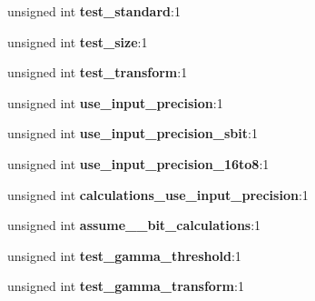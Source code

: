 \begin{DoxyCompactItemize}
\item 
\hypertarget{structpng__modifier_a17ee5be3901e31e15889a9d1219aaf1a}{unsigned int {\bfseries test\+\_\+standard}\+:1}\label{structpng__modifier_a17ee5be3901e31e15889a9d1219aaf1a}

\item 
\hypertarget{structpng__modifier_af2bba8abaec2e8b6a43a9470879157bd}{unsigned int {\bfseries test\+\_\+size}\+:1}\label{structpng__modifier_af2bba8abaec2e8b6a43a9470879157bd}

\item 
\hypertarget{structpng__modifier_a07e46663a0a1716c9cadeabee28fb276}{unsigned int {\bfseries test\+\_\+transform}\+:1}\label{structpng__modifier_a07e46663a0a1716c9cadeabee28fb276}

\item 
\hypertarget{structpng__modifier_a45224d5d5b3b1eaa224e5f294590e587}{unsigned int {\bfseries use\+\_\+input\+\_\+precision}\+:1}\label{structpng__modifier_a45224d5d5b3b1eaa224e5f294590e587}

\item 
\hypertarget{structpng__modifier_aa70c641991b61009ef9ec5586fe2af20}{unsigned int {\bfseries use\+\_\+input\+\_\+precision\+\_\+sbit}\+:1}\label{structpng__modifier_aa70c641991b61009ef9ec5586fe2af20}

\item 
\hypertarget{structpng__modifier_adba8258b8221e69c954605e784e686f5}{unsigned int {\bfseries use\+\_\+input\+\_\+precision\+\_\+16to8}\+:1}\label{structpng__modifier_adba8258b8221e69c954605e784e686f5}

\item 
\hypertarget{structpng__modifier_a344bf0735bde6465501e496cc6e5022c}{unsigned int {\bfseries calculations\+\_\+use\+\_\+input\+\_\+precision}\+:1}\label{structpng__modifier_a344bf0735bde6465501e496cc6e5022c}

\item 
\hypertarget{structpng__modifier_acf4d6104b5323a8ba205bd6451284943}{unsigned int {\bfseries assume\+\_\+\_\+bit\+\_\+calculations}\+:1}\label{structpng__modifier_acf4d6104b5323a8ba205bd6451284943}

\item 
\hypertarget{structpng__modifier_ace2fd816652bee5a3338b05e725c83c2}{unsigned int {\bfseries test\+\_\+gamma\+\_\+threshold}\+:1}\label{structpng__modifier_ace2fd816652bee5a3338b05e725c83c2}

\item 
\hypertarget{structpng__modifier_a58d79506d7adcc877528f5824edfda48}{unsigned int {\bfseries test\+\_\+gamma\+\_\+transform}\+:1}\label{structpng__modifier_a58d79506d7adcc877528f5824edfda48}


\end{DoxyCompactItemize}
